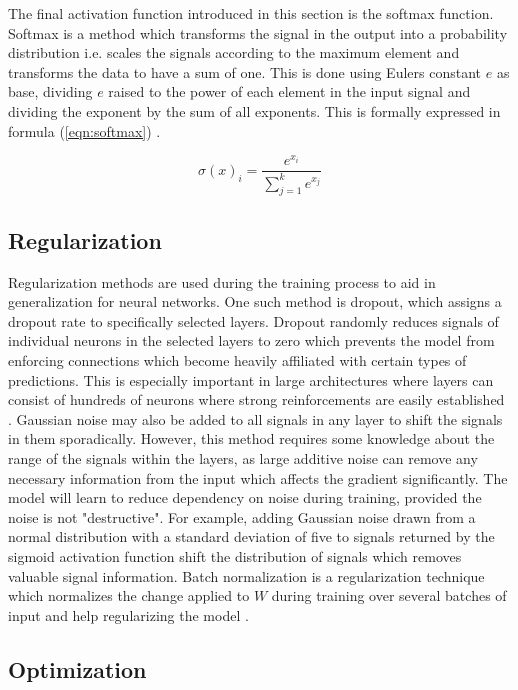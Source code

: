 The final activation function introduced in this section is the softmax function. Softmax is a method which transforms the signal in the output into a probability distribution i.e. scales the signals according to the maximum element and transforms the data to have a sum of one. This is done using Eulers constant $e$ as base, dividing $e$ raised to the power of each element in the input signal and dividing the exponent by the sum of all exponents. This is formally expressed in formula (\ref{eqn:softmax}) \cite{misra2019mish}.

\begin{equation}
\label{eqn:softmax}
\sigma(x)_i = \frac{e^{x_i}}{\sum_{j=1}^k e^{x_j}}
\end{equation}

\subsection{Regularization}
Regularization methods are used during the training process to aid in generalization for neural networks. One such method is dropout, which assigns a dropout rate to specifically selected layers. Dropout randomly reduces signals of individual neurons in the selected layers to zero which prevents the model from enforcing connections which become heavily affiliated with certain types of predictions. This is especially important in large architectures where layers can consist of hundreds of neurons where strong reinforcements are easily established \cite{srivastava2013improving}. Gaussian noise may also be added to all signals in any layer to shift the signals in them sporadically. However, this method requires some knowledge about the range of the signals within the layers, as large additive noise can remove any necessary information from the input which affects the gradient significantly. The model will learn to reduce dependency on noise during training, provided the noise is not "destructive". For example, adding Gaussian noise drawn from a normal distribution with a standard deviation of five to signals returned by the sigmoid activation function shift the distribution of signals which removes valuable signal information. Batch normalization is a regularization technique which normalizes the change applied to $W$ during training over several batches of input and help regularizing the model \cite{santurkar2018does}.

\subsection{Optimization}

